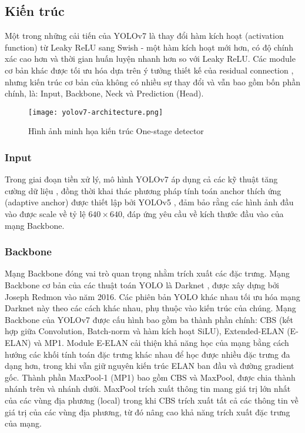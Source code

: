 \subsection{Kiến trúc}
Một trong những cải tiến của YOLOv7 là thay đổi hàm kích hoạt (activation function) từ Leaky ReLU \cite{maas2013rectifier} sang Swish \cite{ramachandran2017searching} - một hàm kích hoạt mới hơn, có độ chính xác cao hơn và thời gian huấn luyện nhanh hơn so với Leaky ReLU. Các module cơ bản khác được tối ưu hóa dựa trên ý tưởng thiết kế của residual connection \cite{he2016deep}, nhưng kiến trúc cơ bản của không có nhiều sự thay đổi và vẫn bao gồm bốn phần chính, là: Input, Backbone, Neck và 	Prediction (Head).

\begin{figure}[h]
	\center
	\texttt{[image: yolov7-architecture.png]}
	\caption{Hình ảnh minh họa kiến trúc One-stage detector}
\end{figure}

\subsubsection*{Input}
Trong giai đoạn tiền xử lý, mô hình YOLOv7 áp dụng cả các kỹ thuật tăng cường dữ liệu \citep{bochkovskiy2020yolov4, tan2019mixconv}, đồng thời khai thác phương pháp tính toán anchor thích ứng (adaptive anchor) được thiết lập bởi YOLOv5 \cite{Glenn2022yolov5}, đảm bảo rằng các hình ảnh đầu vào được scale về tỷ lệ $640 \times 640$, đáp ứng yêu cầu về kích thước đầu vào của mạng Backbone.

\subsubsection*{Backbone}
Mạng Backbone đóng vai trò quan trọng nhằm trích xuất các đặc trưng.
Mạng Backbone cơ bản của các thuật toán YOLO là Darknet \cite{Redmon_2016_CVPR}, được xây dựng bởi Joseph Redmon vào năm 2016. Các phiên bản YOLO khác nhau tối ưu hóa mạng Darknet này theo các cách khác nhau, phụ thuộc vào kiến trúc của chúng. Mạng Backbone của YOLOv7 được cấu hình bao gồm ba thành phần chính: CBS (kết hợp giữa Convolution, Batch-norm và hàm kích hoạt SiLU), Extended-ELAN (E-ELAN) và MP1. Module E-ELAN cải thiện khả năng học của mạng bằng cách hướng các khối tính toán đặc trưng khác nhau để học được nhiều đặc trưng đa dạng hơn, trong khi vẫn giữ nguyên kiến trúc ELAN ban đầu và đường gradient gốc. Thành phần MaxPool-1 (MP1) bao gồm CBS và MaxPool, được chia thành nhánh trên và nhánh dưới. MaxPool trích xuất thông tin mang giá trị lớn nhất của các vùng địa phương (local) trong khi CBS trích xuất tất cả các thông tin về giá trị của các vùng địa phương, từ đó nâng cao khả năng trích xuất đặc trưng của mạng.

